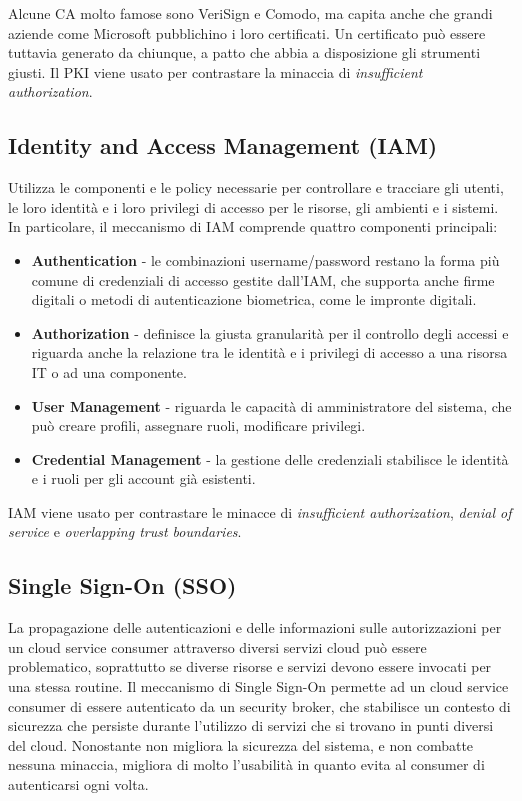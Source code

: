 \vspace{5mm}

Alcune CA molto famose sono VeriSign e Comodo, ma capita anche che grandi aziende come Microsoft pubblichino i loro certificati. Un certificato può essere tuttavia generato da chiunque, a patto che abbia a disposizione gli strumenti giusti. Il PKI viene usato per contrastare la minaccia di \textit{insufficient authorization}.

\subsection{Identity and Access Management (IAM)}
Utilizza le componenti e le policy necessarie per controllare e tracciare gli utenti, le loro identità e i loro privilegi di accesso per le risorse, gli ambienti e i sistemi. In particolare, il meccanismo di IAM comprende quattro componenti principali:
\begin{itemize}
    \item \textbf{Authentication} - le combinazioni username/password restano la forma più comune di credenziali di accesso gestite dall'IAM, che supporta anche firme digitali o metodi di autenticazione biometrica, come le impronte digitali.
    \item \textbf{Authorization} - definisce la giusta granularità per il controllo degli accessi e riguarda anche la relazione tra le identità e i privilegi di accesso a una risorsa IT o ad una componente.
    \item \textbf{User Management} - riguarda le capacità di amministratore del sistema, che può creare profili, assegnare ruoli, modificare privilegi.
    \item \textbf{Credential Management} - la gestione delle credenziali stabilisce le identità e i ruoli per gli account già esistenti.
\end{itemize}
IAM viene usato per contrastare le minacce di \textit{insufficient authorization}, \textit{denial of service} e \textit{overlapping trust boundaries}.

\subsection{Single Sign-On (SSO)}
La propagazione delle autenticazioni e delle informazioni sulle autorizzazioni per un cloud service consumer attraverso diversi servizi cloud può essere problematico, soprattutto se diverse risorse e servizi devono essere invocati per una stessa routine. Il meccanismo di Single Sign-On permette ad un cloud service consumer di essere autenticato da un security broker, che stabilisce un contesto di sicurezza che persiste durante l'utilizzo di servizi che si trovano in punti diversi del cloud. Nonostante non migliora la sicurezza del sistema, e non combatte nessuna minaccia,  migliora di molto l'usabilità in quanto evita al consumer di autenticarsi ogni volta.

